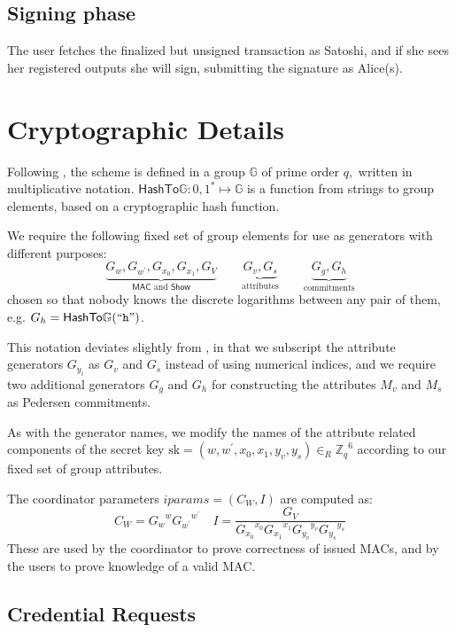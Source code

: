 \documentclass{article}
\begin{document}
\subsection{Signing phase}

The user fetches the finalized but unsigned transaction as Satoshi, and if she sees her registered outputs she will sign, submitting the signature as Alice(s).

\section{Cryptographic Details}\label{details}

Following \cite{chase2019signal}, the scheme is defined in a group \(\mathbb{G}\) of prime order \(q,\) written in multiplicative notation.
$\mathsf{HashTo\mathbb{G}} : {0,1}^* \mapsto \mathbb{G}$ is a function from strings to group elements, based on a cryptographic hash function.

We require the following fixed set of group elements for use as generators with different purposes:
\[
\underbrace{G_{w}, G_{w^{\prime}}, G_{x_{0}}, G_{x_{1}}, G_{V}}_{\mathsf{MAC} \text{~and~} \mathsf{Show}}
\qquad
\underbrace{G_{v}, G_{s}}_{\text{attributes}}
\qquad
\underbrace{G_g, G_h}_{\text{commitments}}
\]
chosen so that nobody knows the discrete logarithms between any pair of them, e.g. $G_h = \mathsf{HashTo\mathbb{G}}(``\texttt{h}")$.

This notation deviates slightly from \cite{chase2019signal}, in that we subscript the attribute generators $G_{y_i}$ as $G_v$ and $G_s$ instead of using numerical indices, and we require two additional generators $G_g$ and $G_h$ for constructing the attributes $M_v$ and $M_s$ as Pedersen commitments.

As with the generator names, we modify the names of the attribute related components of the secret key
$\mathrm{sk} = (w, w^{\prime}, x_{0}, x_{1}, y_{v}, y_{s}) \in_R {\mathbb{Z}_q}^6$
according to our fixed set of group attributes.

The coordinator parameters
$\mathit{iparams} =  (C_{W}, I)$
are computed as:
\[
C_{W}={G_w}^{w} {G_{w^\prime}}^{w^\prime}
\quad
I=\frac{G_{V}}{{G_{x_0}}^{x_0} {G_{x_1}}^{x_1} {G_{y_v}}^{y_v} {G_{y_s}}^{y_s}}
\]
These are used by the coordinator to prove correctness of issued MACs, and by the users to prove knowledge of a valid MAC.

\subsection{Credential Requests}
\end{document}
